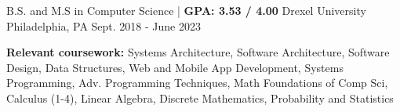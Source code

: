 

\begin{cventries}

  \cventry
  {B.S. and M.S in Computer Science | \textbf{ GPA: 3.53 / 4.00}} %
  {Drexel University} %
  {Philadelphia, PA} %
  {Sept. 2018 - June 2023} %
  {
    \begin{cvitems} %
      \item {\color{darktext} \textbf{Relevant coursework:}} Systems Architecture, Software Architecture, Software Design, Data Structures, Web and Mobile App Development, Systems Programming, Adv. Programming Techniques, Math Foundations of Comp Sci, Calculus (1-4), Linear Algebra, Discrete Mathematics, Probability and Statistics
    \end{cvitems}
  }

\end{cventries}

